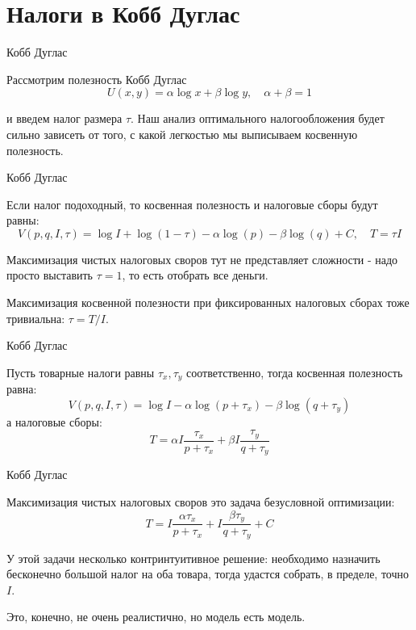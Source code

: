 \documentclass{beamer}
\begin{document}
\section{Налоги в Кобб Дуглас}

\begin{frame}{Кобб Дуглас}

Рассмотрим полезность Кобб Дуглас 
$$U(x,y) = \alpha \log x + \beta \log y, \quad \alpha + \beta = 1$$

и введем налог размера $\tau$. Наш анализ оптимального налогообложения будет сильно зависеть от того, с какой легкостью мы выписываем косвенную полезность.

\end{frame}

\begin{frame}{Кобб Дуглас}

Если налог подоходный, то косвенная полезность и налоговые сборы будут равны:
$$ V(p,q,I,\tau) = \log I + \log (1-\tau) - \alpha \log(p) - \beta \log (q) + C, \quad T = \tau I $$

Максимизация чистых налоговых своров тут не представляет сложности - надо просто выставить $\tau = 1$, то есть отобрать все деньги. 

Максимизация косвенной полезности при фиксированных налоговых сборах тоже тривиальна: $\tau = T/I$.

\end{frame}

\begin{frame}{Кобб Дуглас}

Пусть товарные налоги равны $\tau_x, \tau_y$ соответственно, тогда косвенная полезность равна:
$$V(p,q,I,\tau) = \log I - \alpha \log(p + \tau_x) - \beta \log (q + \tau_y)$$
а налоговые сборы:
$$T = \alpha I \frac{\tau_x}{p+\tau_x} + \beta I \frac{\tau_y}{q+\tau_y}$$

\end{frame}

\begin{frame}{Кобб Дуглас}

Максимизация чистых налоговых своров это задача безусловной оптимизации:
$$T =  I \frac{ \alpha\tau_x}{p+\tau_x} + I \frac{\beta \tau_y}{q+\tau_y} + C$$

У этой задачи несколько контринтуитивное решение: необходимо назначить бесконечно большой налог на оба товара, тогда удастся собрать, в пределе, точно $I$. 

Это, конечно, не очень реалистично, но модель есть модель.

\end{frame}
\end{document}
